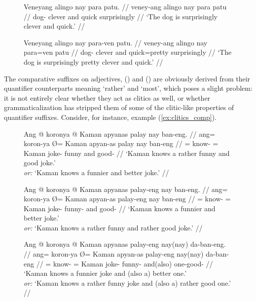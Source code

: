 \begin{figure}
\pex\label{ex:clitics_62}
\a\label{ex:clitics_62a}\begingl
	\gla Veneyang alingo nay para patu. //
	\glb veney-ang alingo nay para patu //
	\glc dog-\Aarg{} clever and quick surprisingly //
	\glft `The dog is surprisingly clever and quick.' //
\endgl

\a\label{ex:clitics_62b}\begingl
	\gla Veneyang alingo nay para-ven patu. //
	\glb veney-ang alingo nay para=ven patu //
	\glc dog-\Aarg{} clever and quick=pretty surprisingly //
	\glft `The dog is surprisingly pretty clever and quick.' //
\endgl
\xe
\end{figure}

The comparative suffixes on adjectives,  (\Comp{}) and
 (\Supl{}) are obviously derived from their quantifier
counterparts meaning `rather' and `most', which poses a slight problem: it is
not entirely clear whether they act as clitics as well, or whether
grammaticalization has stripped them of some of the
clitic-like properties of quantifier suffixes. Consider, for instance, example
(\ref{ex:clitics_comp}).

\begin{figure}
\pex\label{ex:clitics_comp}
\a\label{ex:clitics_comp1}\begingl
	\gla Ang @ koronya {} @ Kaman apyanas palay nay ban-eng. //
	\glb ang= koron-ya Ø= Kaman apyan-as palay nay ban-eng //
	\glc \AgtT{}= know-\TsgM{} \Top{}= Kaman joke-\Parg{} funny and
		good-\Comp{} //
	\glft `Kaman knows a rather funny and good joke.' \\
		\textit{or:} `Kaman knows a funnier and better joke.' //
\endgl

\a\label{ex:clitics_comp2}\begingl
	\gla Ang @ koronya {} @ Kaman apyanas palay-eng nay ban-eng. //
	\glb ang= koron-ya Ø= Kaman apyan-as palay-eng nay ban-eng //
	\glc \AgtT{}= know-\TsgM{} \Top{}= Kaman joke-\Parg{} funny-\Comp{} and
		good-\Comp{} //
	\glft `Kaman knows a funnier and better joke.' \\
		\textit{or:} `Kaman knows a rather funny and rather good joke.' //
\endgl

\a\label{ex:clitics_comp3}\begingl
	\gla Ang @ koronya {} @ Kaman apyanas palay-eng nay(nay) da-ban-eng. //
	\glb ang= koron-ya Ø= Kaman apyan-as palay-eng nay(nay) da-ban-eng //
	\glc \AgtT{}= know-\TsgM{} \Top{}= Kaman joke-\Parg{} funny-\Comp{}
		and(\til{}also) one-good-\Comp{} //
	\glft `Kaman knows a funnier joke and (also a) better one.' \\
		\textit{or:} `Kaman knows a rather funny joke and (also a) rather good 
		one.' //
\endgl
\xe
\end{figure}

